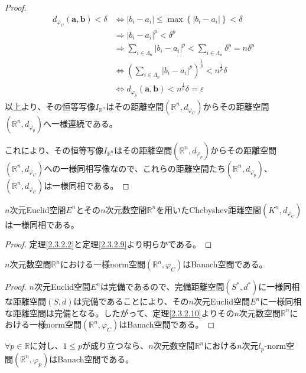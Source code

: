 \documentclass[dvipdfmx]{jsarticle}
\begin{document}
\begin{proof}
\begin{align*}
d_{\varphi_{C}}\left( \mathbf{a},\mathbf{b} \right) < \delta &\Leftrightarrow \left| b_{i} - a_{i} \right| \leq \max\left\{ \left| b_{i} - a_{i} \right| \right\} < \delta\\
&\Rightarrow \left| b_{i} - a_{i} \right|^{p} < \delta^{p}\\
&\Rightarrow \sum_{i \in \varLambda_{n}} \left| b_{i} - a_{i} \right|^{p} < \sum_{i \in \varLambda_{n}} \delta^{p} = n\delta^{p}\\
&\Leftrightarrow \left( \sum_{i \in \varLambda_{n}} \left| b_{i} - a_{i} \right|^{p} \right)^{\frac{1}{p}} < n^{\frac{1}{p}}\delta\\
&\Leftrightarrow d_{\varphi_{p}}\left( \mathbf{a},\mathbf{b} \right) < n^{\frac{1}{p}}\delta = \varepsilon
\end{align*}
以上より、その恒等写像$I_{\mathbb{R}^{n}}$はその距離空間$\left( \mathbb{R}^{n},d_{\varphi_{C}} \right)$からその距離空間$\left( \mathbb{R}^{n},d_{\varphi_{p}} \right)$へ一様連続である。\par
これにより、その恒等写像$I_{\mathbb{R}^{n}}$はその距離空間$\left( \mathbb{R}^{n},d_{\varphi_{p}} \right)$からその距離空間$\left( \mathbb{R}^{n},d_{\varphi_{C}} \right)$への一様同相写像なので、これらの距離空間たち$\left( \mathbb{R}^{n},d_{\varphi_{p}} \right)$、$\left( \mathbb{R}^{n},d_{\varphi_{C}} \right)$は一様同相である。
\end{proof}
\begin{thm}\label{2.3.2.10}
$n$次元Euclid空間$E^{n}$とその$n$次元数空間$\mathbb{R}^{n}$を用いたChebyshev距離空間$\left( K^{n},d_{\varphi_{C}} \right)$は一様同相である。
\end{thm}
\begin{proof}
定理\ref{2.3.2.2}と定理\ref{2.3.2.9}より明らかである。
\end{proof}
\begin{thm}\label{2.3.2.11}
$n$次元数空間$\mathbb{R}^{n}$における一様norm空間$\left( \mathbb{R}^{n},\varphi_{C} \right)$はBanach空間である。
\end{thm}
\begin{proof}
$n$次元Euclid空間$E^{n}$は完備であるので、完備距離空間$\left( S^{*},d^{*} \right)$に一様同相な距離空間$(S,d)$は完備であることにより、その$n$次元Euclid空間$E^{n}$に一様同相な距離空間は完備となる。したがって、定理\ref{2.3.2.10}よりその$n$次元数空間$\mathbb{R}^{n}$における一様norm空間$\left( \mathbb{R}^{n},\varphi_{C} \right)$はBanach空間である。
\end{proof}
\begin{thm}\label{2.3.2.12}
$\forall p \in \mathbb{R}$に対し、$1 \leq p$が成り立つなら、$n$次元数空間$\mathbb{R}^{n}$における$n$次元$l_{p}$-norm空間$\left( \mathbb{R}^{n},\varphi_{p} \right)$はBanach空間である。
\end{thm}
\end{document}

